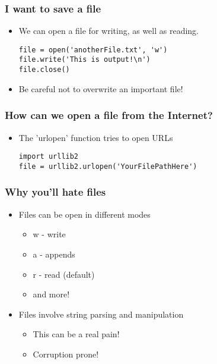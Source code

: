 \documentclass{beamer}
\begin{document}
\begin{frame}[fragile]
\frametitle{I want to save a file}
\begin{itemize}
\item We can open a file for writing, as well as reading.
  \begin{lstlisting}
file = open('anotherFile.txt', 'w')
file.write('This is output!\n')
file.close() 
  \end{lstlisting}
\item Be careful not to overwrite an important file!
\end{itemize}
\end{frame}

\begin{frame}[fragile]
\frametitle{How can we open a file from the Internet?}
\begin{itemize}
\item The 'urlopen' function tries to open URLs
\begin{lstlisting}
import urllib2
file = urllib2.urlopen('YourFilePathHere')
\end{lstlisting}
\end{itemize}
\end{frame}

\begin{frame}[fragile]
\frametitle{Why you'll hate files}
\begin{itemize}
\item Files can be open in different modes
\begin{itemize}
\item w - write
\item a - appends
\item r - read (default)
\item and more!
\end{itemize}
\item Files involve string parsing and manipulation
\begin{itemize}
\item This can be a real pain!
\item Corruption prone!
\end{itemize}
\end{itemize} 
\end{frame}
\end{document}
